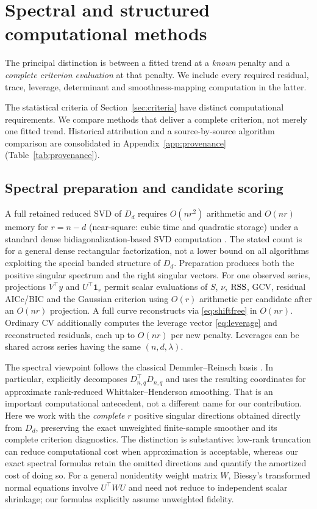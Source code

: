\section{Spectral and structured computational methods}\label{sec:algorithms}
The principal distinction is between a fitted trend at a \emph{known} penalty and a \emph{complete criterion evaluation} at that penalty. We include every required residual, trace, leverage, determinant and smoothness-mapping computation in the latter.

The statistical criteria of Section~\ref{sec:criteria}
have distinct computational requirements.  We compare
methods that deliver a complete criterion, not merely
one fitted trend.  Historical attribution and a
source-by-source algorithm comparison are consolidated
in Appendix~\ref{app:provenance}
(Table~\ref{tab:provenance}).

\subsection{Spectral preparation and candidate scoring}
A full retained reduced SVD of $D_d$ requires $O(nr^2)$ arithmetic and $O(nr)$ memory for $r=n-d$ (near-square: cubic time and quadratic storage) under a standard dense bidiagonalization-based SVD computation \citep{golubkahan1965,golubreinsch1970,golubvanloan2013}. The stated count is for a general dense rectangular factorization, not a lower bound on all algorithms exploiting the special banded structure of $D_d$. Preparation produces both the positive singular spectrum and the right singular vectors. For one observed series, projections $V^\top y$ and $U^\top\mathbf1_r$ permit scalar evaluations of $S$, $\nu$, $\operatorname{RSS}$, GCV, residual AICc/BIC and the Gaussian criterion using $O(r)$ arithmetic per candidate after an $O(nr)$ projection. A full curve reconstructs via \eqref{eq:shiftfree} in $O(nr)$. Ordinary CV additionally computes the leverage vector \eqref{eq:leverage} and reconstructed residuals, each up to $O(nr)$ per new penalty. Leverages can be shared across series having the same $(n,d,\lambda)$.

The spectral viewpoint follows the classical
Demmler--Reinsch basis \citep{demmler1975}. In particular,
\citet[Sec.~6.4]{biessy2026} explicitly decomposes
$D_{n,q}^\top D_{n,q}$ and uses the resulting coordinates
for approximate rank-reduced Whittaker--Henderson smoothing.
That is an important computational antecedent, not a
different name for our contribution. Here we work with
the \emph{complete} $r$ positive singular directions
obtained directly from $D_d$, preserving the exact
unweighted finite-sample smoother and its complete
criterion diagnostics. The distinction is substantive:
low-rank truncation can reduce computational cost when
approximation is acceptable, whereas our exact
spectral formulas retain the omitted directions and
quantify the amortized cost of doing so. For a general
nonidentity weight matrix $W$, Biessy's transformed
normal equations involve $U^\top WU$ and need not
reduce to independent scalar shrinkage; our formulas
explicitly assume unweighted fidelity.


